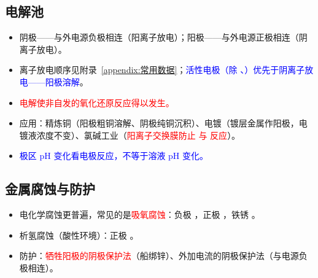         \subsection{电解池}

            \begin{itemize}
                \item 阴极——与外电源负极相连（阳离子放电）；阳极——与外电源正极相连（阴离子放电）。
                \item 离子放电顺序见附录~\ref{appendix:常用数据}；\textcolor{blue}{活性电极（除 、）优先于阴离子放电——阳极溶解}。
                \item \textcolor{red}{电解使非自发的氧化还原反应得以发生。}
                \item 应用：精炼铜（阳极粗铜溶解、阴极纯铜沉积）、电镀（镀层金属作阳极，电镀液浓度不变）、氯碱工业（\textcolor{red}{阳离子交换膜防止  与  反应}）。
                \item \textcolor{blue}{极区 pH 变化看电极反应，不等于溶液 pH 变化。}
            \end{itemize}

        \subsection{金属腐蚀与防护}

            \begin{itemize}
                \item 电化学腐蚀更普遍，常见的是\textcolor{red}{吸氧腐蚀}：负极 ，正极 ，铁锈 。
                \item 析氢腐蚀（酸性环境）：正极 。
                \item 防护：\textcolor{red}{牺牲阳极的阴极保护法}（船绑锌）、外加电流的阴极保护法（与电源负极相连）。
            \end{itemize}
